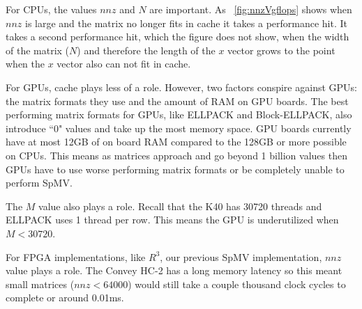 For CPUs, the values $nnz$ and $N$ are important. As \figurename~\ref{fig:nnzVgflops} shows when  $nnz$ is large and the matrix no longer fits in cache it takes a performance hit. It takes a second performance hit, which the figure does not show,  when the width of the matrix ($N$) and therefore the length of the $x$ vector grows to the point when the $x$ vector also can not fit in cache. \par
For GPUs, cache plays less of a role. However, two factors conspire against GPUs: the matrix formats they use and the amount of RAM on GPU boards. The best performing matrix formats for GPUs, like ELLPACK and Block-ELLPACK, also introduce ``0" values and take up the most memory space. GPU boards currently have at most 12GB of on board RAM compared to the 128GB or more possible on CPUs. This means as matrices approach and go beyond 1 billion values then GPUs have to use worse performing matrix formats or be completely unable to perform SpMV. \par
The $M$ value also plays a role. Recall that the K40 has 30720 threads and ELLPACK uses 1 thread per row. This means the GPU is underutilized when $M<30720$.\par
For FPGA implementations, like $R^3$, our previous SpMV implementation, $nnz$ value plays a role. The Convey HC-2 has a long memory latency so this meant small matrices ($nnz<64000$) would still take a couple thousand clock cycles to complete or around 0.01ms.\par

